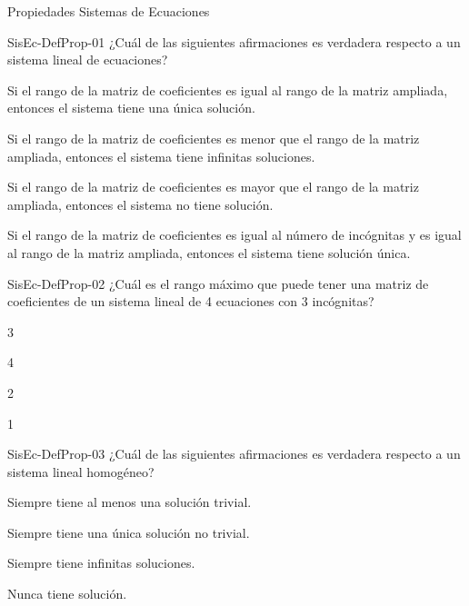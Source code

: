\documentclass[a4,11pt]{aleph-notas}
\begin{document}
\begin{quiz}{Propiedades Sistemas de Ecuaciones}

\begin{multi}[]%
    {SisEc-DefProp-01}
    ¿Cuál de las siguientes afirmaciones es verdadera respecto a un sistema lineal de ecuaciones?
    \item Si el rango de la matriz de coeficientes es igual al rango de la matriz ampliada, entonces el sistema tiene una única solución.
    \item Si el rango de la matriz de coeficientes es menor que el rango de la matriz ampliada, entonces el sistema tiene infinitas soluciones.
    \item Si el rango de la matriz de coeficientes es mayor que el rango de la matriz ampliada, entonces el sistema no tiene solución.
    \item* Si el rango de la matriz de coeficientes es igual al número de incógnitas y es igual al rango de la matriz ampliada, entonces el sistema tiene solución única.
\end{multi}

\begin{multi}[]%
    {SisEc-DefProp-02}
    ¿Cuál es el rango máximo que puede tener una matriz de coeficientes de un sistema lineal de 4 ecuaciones con 3 incógnitas?
    \item* 3
    \item 4
    \item 2
    \item 1
\end{multi}
    
\begin{multi}[]%
    {SisEc-DefProp-03}
    ¿Cuál de las siguientes afirmaciones es verdadera respecto a un sistema lineal homogéneo?
    \item* Siempre tiene al menos una solución trivial.
    \item Siempre tiene una única solución no trivial.
    \item Siempre tiene infinitas soluciones.
    \item Nunca tiene solución.
\end{multi}
    

\end{quiz}
\end{document}

